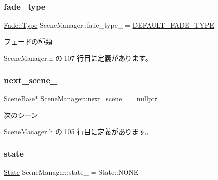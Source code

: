 \subsubsection{\texorpdfstring{fade\+\_\+type\+\_\+}{fade\_type\_}}
{\footnotesize\ttfamily \mbox{\hyperlink{class_fade_ac06f27215b454aa05b93c236476d6e80}{Fade\+::\+Type}} Scene\+Manager\+::fade\+\_\+type\+\_\+ = \mbox{\hyperlink{class_scene_manager_ab87f30ef7e11305bb4e3400b41225c22}{D\+E\+F\+A\+U\+L\+T\+\_\+\+F\+A\+D\+E\+\_\+\+T\+Y\+PE}}\hspace{0.3cm}{\ttfamily [private]}}



フェードの種類 



 Scene\+Manager.\+h の 107 行目に定義があります。

\mbox{\label{class_scene_manager_a7f9bb649125a114715b07154ac3df6ae}} 
\subsubsection{\texorpdfstring{next\+\_\+scene\+\_\+}{next\_scene\_}}
{\footnotesize\ttfamily \mbox{\hyperlink{class_scene_base}{Scene\+Base}}$\ast$ Scene\+Manager\+::next\+\_\+scene\+\_\+ = nullptr\hspace{0.3cm}{\ttfamily [private]}}



次のシーン 



 Scene\+Manager.\+h の 105 行目に定義があります。

\mbox{\label{class_scene_manager_adf81d8a63dee92bfe5bb934903542bec}} 
\subsubsection{\texorpdfstring{state\+\_\+}{state\_}}
{\footnotesize\ttfamily \mbox{\hyperlink{class_scene_manager_a68d32794fe1ce945c6a6c380c11a08eb}{State}} Scene\+Manager\+::state\+\_\+ = State\+::\+N\+O\+NE\hspace{0.3cm}{\ttfamily [private]}}



